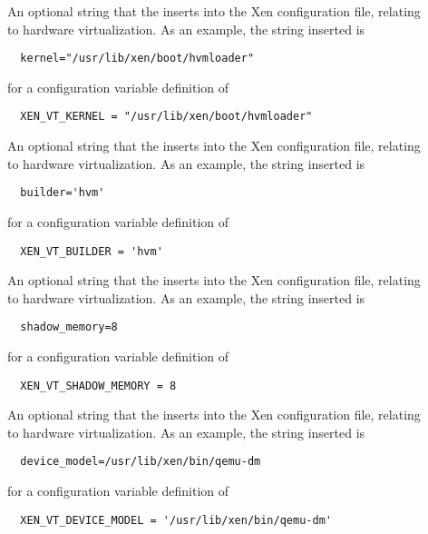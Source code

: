\begin{description}
\item[]
  \label{param:XenVTKernel}
  An optional string that the 
  inserts into the Xen configuration file, relating to hardware virtualization.
  As an example, the string inserted is
  \begin{verbatim}
  kernel="/usr/lib/xen/boot/hvmloader"
  \end{verbatim}
  for a configuration variable definition of
  \begin{verbatim}
  XEN_VT_KERNEL = "/usr/lib/xen/boot/hvmloader"
  \end{verbatim}

\item[]
  \label{param:XenVTBuilder}
  An optional string that the 
  inserts into the Xen configuration file, relating to hardware virtualization.
  As an example, the string inserted is
  \begin{verbatim}
  builder='hvm'
  \end{verbatim}
  for a configuration variable definition of
  \begin{verbatim}
  XEN_VT_BUILDER = 'hvm'
  \end{verbatim}

\item[]
  \label{param:XenVTShadowMemory}
  An optional string that the 
  inserts into the Xen configuration file, relating to hardware virtualization.
  As an example, the string inserted is
  \begin{verbatim}
  shadow_memory=8
  \end{verbatim}
  for a configuration variable definition of
  \begin{verbatim}
  XEN_VT_SHADOW_MEMORY = 8
  \end{verbatim}

\item[]
  \label{param:XenVTDeviceModel}
  An optional string that the 
  inserts into the Xen configuration file, relating to hardware virtualization.
  As an example, the string inserted is
  \begin{verbatim}
  device_model=/usr/lib/xen/bin/qemu-dm
  \end{verbatim}
  for a configuration variable definition of
  \begin{verbatim}
  XEN_VT_DEVICE_MODEL = '/usr/lib/xen/bin/qemu-dm'
  \end{verbatim}


\end{description}
